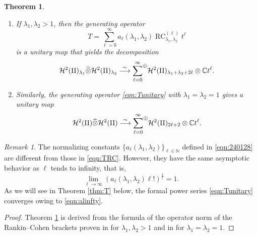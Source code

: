 \documentclass[12pt]{amsart}
\newcommand{\RC}{\operatorname{RC}}
\theoremstyle{plain} %
\newtheorem{theorem}{Theorem}
\theoremstyle{definition} %
\theoremstyle{remark} %
\newtheorem{remark}{Remark} %
\begin{document}
\begin{theorem}
\label{thm:24012807}
\begin{enumerate}
\item[{\rm{(1)}}]
If $\lambda_1, \lambda_2>1$, 
 then the generating operator
\begin{equation}
\label{eqn:Tunitary}
T=\sum_{\ell=0}^{\infty}
a_{\ell}(\lambda_1, \lambda_2) \RC_{\lambda_1, \lambda_2}^{(\ell)}
 t^{\ell}
\end{equation}
is a unitary map
 that yields the decomposition 
\begin{equation}
\label{eqn:Hfusion}
 {\mathcal{H}}^2(\Pi)_{\lambda_1} \widehat\otimes {\mathcal{H}}^2(\Pi)_{\lambda_2}
  \overset \sim \longrightarrow 
  {\sum_{\ell=0}^{\infty}}{\raisebox{.8em}{\text{\footnotesize{$\oplus$}}}}
  {\mathcal{H}}^2(\Pi)_{\lambda_1+\lambda_2+2\ell}
  \otimes {\mathbb{C}} t^{\ell}.  
\end{equation}
\item[{\rm{(2)}}]
Similarly, 
 the generating operator \eqref{eqn:Tunitary}
 with $\lambda_1=\lambda_2=1$
 gives a unitary map
\[
 {\mathcal{H}}^2(\Pi) \widehat\otimes {\mathcal{H}}^2(\Pi)
  \overset \sim \longrightarrow
  {\sum_{\ell=0}^{\infty}}{\raisebox{.8em}{\text{\footnotesize{$\oplus$}}}}
  {\mathcal{H}}^2(\Pi)_{2\ell+2}
  \otimes {\mathbb{C}} t^{\ell}.  
\]
\end{enumerate}
\end{theorem}

\begin{remark}
The normalizing constants
 $\{a_{\ell}(\lambda_1, \lambda_2)\}_{\ell \in {\mathbb{N}}}$
 defined in \eqref{eqn:240128} are 
 different from those in \eqref{eqn:TRC}.  
However, 
 they have the same asymptotic behavior 
 as $\ell$ tends to infinity, 
 that is, 
\begin{equation}
\label{eqn:alinfty}
\underset{\ell \to \infty}\lim(a_{\ell}(\lambda_1, \lambda_2)\ell!)^{\frac 1 \ell}=1.  
\end{equation}
As we will see in Theorem \ref{thm:T} below, 
the formal power series 
\eqref{eqn:Tunitary} converges
  owing to \eqref{eqn:alinfty}.  
\end{remark}

\begin{proof}
Theorem \ref{thm:24012807} is derived from the formula of the operator norm
 of the Rankin--Cohen brackets 
 proven in \cite[Thm.\ 2.7]{KPinv}
 for $\lambda_1, \lambda_2 >1$
 and in \cite[Thm.\ 5.1]{KPgen} for $\lambda_1=\lambda_2=1$.  
\end{proof}
\end{document}

